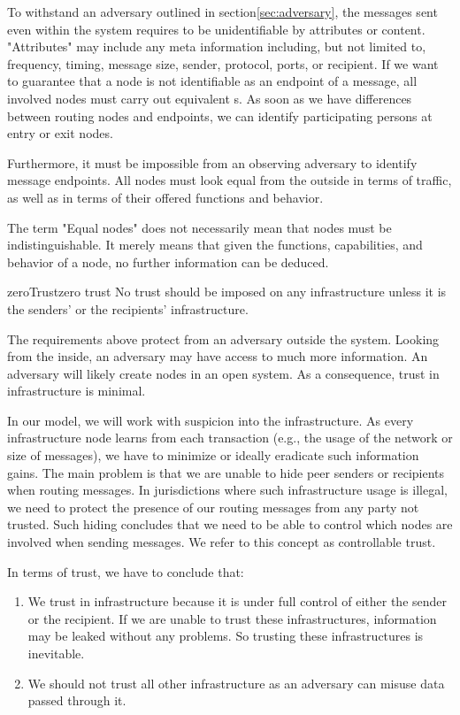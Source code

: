To withstand an adversary outlined in section\ref{sec:adversary}, the messages sent even within the system requires to be unidentifiable by attributes or content. "Attributes" may include any meta information including, but not limited to, frequency, timing, message size, sender, protocol, ports, or recipient. If we want to guarantee that a node is not identifiable as an endpoint of a message, all involved nodes must carry out equivalent s. As soon as we have differences between routing nodes and endpoints, we can identify participating persons at entry or exit nodes.

Furthermore, it must be impossible from an observing adversary to identify message endpoints. All nodes must look equal from the outside in terms of traffic, as well as in terms of their offered functions and behavior. 

The term "Equal nodes" does not necessarily mean that nodes must be indistinguishable. It merely means that given the functions, capabilities, and behavior of a node, no further information can be deduced.

\begin{requirement}{zeroTrust}{zero trust}
	No trust should be imposed on any infrastructure unless it is the senders' or the recipients' infrastructure.
\end{requirement}    

The requirements above protect from an adversary outside the system. Looking from the inside, an adversary may have access to much more information. An adversary will likely create nodes in an open system. As a consequence, trust in infrastructure is minimal.

In our model, we will work with suspicion into the infrastructure. As every infrastructure node learns from each transaction (e.g., the usage of the network or size of messages), we have to minimize or ideally eradicate such information gains. The main problem is that we are unable to hide peer senders or recipients when routing messages. In jurisdictions where such infrastructure usage is illegal, we need to protect the presence of our routing messages from any party not trusted. Such hiding concludes that we need to be able to control which nodes are involved when sending messages. We refer to this concept as controllable trust.

In terms of trust, we have to conclude that:
\begin{enumerate}
	\item We trust in infrastructure because it is under full control of either the sender or the recipient. If we are unable to trust these infrastructures, information may be leaked without any problems. So trusting these infrastructures is inevitable.
	\item We should not trust all other infrastructure as an adversary can misuse data passed through it.
\end{enumerate}

